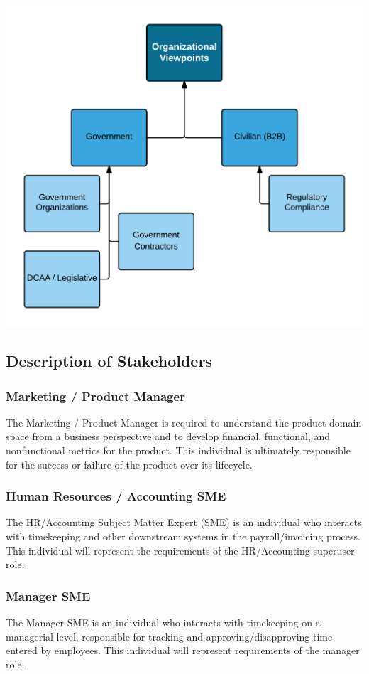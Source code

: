 \documentclass[12pt]{article}
\begin{document}
\begin{center}
	\includegraphics{Graphs/OrgView}
\end{center}

\subsection{Description of Stakeholders}

\subsubsection{Marketing / Product Manager}
The Marketing / Product Manager is required to understand the product domain space from a business perspective and to develop financial, functional, and nonfunctional metrics for the product.  This individual is ultimately responsible for the success or failure of the product over its lifecycle.  

\subsubsection{Human Resources / Accounting  SME}
The HR/Accounting Subject Matter Expert (SME) is an individual who interacts with timekeeping and other downstream systems in the payroll/invoicing process.  This individual will represent the requirements of the HR/Accounting superuser role.

\subsubsection{Manager SME}
The Manager SME is an individual who interacts with timekeeping on a managerial level, responsible for tracking and approving/disapproving time entered by employees.  This individual will represent requirements of the manager role.
\end{document}
